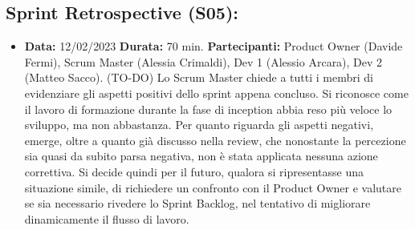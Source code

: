 \documentclass[a4paper, oneside]{article}
\newcommand\uno{Scrum Master (Alessia Crimaldi), Dev 1 (Alessio Arcara), Dev 2 (Matteo Sacco).}
\newcommand\unoP{Product Owner (Davide Fermi), }
\begin{document}
\begin{landscape}
        \newpage
        \subsection{Sprint Retrospective (S05):}
        \begin{itemize}
            \item \textbf{Data:} 12/02/2023
            \newline \textbf{Durata:} 70 min.
            \newline \textbf{Partecipanti:} \unoP \uno
            \newline
            \newline (TO-DO) Lo Scrum Master chiede a tutti i membri di evidenziare gli aspetti positivi dello sprint appena concluso. Si riconosce come il lavoro di formazione durante la fase di inception abbia reso più veloce lo sviluppo, ma non abbastanza. Per quanto riguarda gli aspetti negativi, emerge, oltre a quanto già discusso nella review, che nonostante la percezione sia quasi da subito parsa negativa, non è stata applicata nessuna azione correttiva. Si decide quindi per il futuro, qualora si ripresentasse una situazione simile, di richiedere un confronto con il Product Owner e valutare se sia necessario rivedere lo Sprint Backlog, nel tentativo di migliorare dinamicamente il flusso di lavoro.
        \end{itemize}
    \end{landscape}
\end{document}
